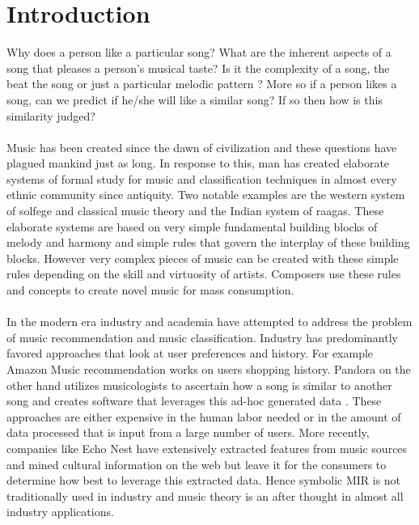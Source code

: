 \chapter{Introduction}
\label{sec:intro}

\noindent Why does a person like a particular song? What are the inherent aspects of a song that pleases a person's musical taste? Is it the complexity of a song, the beat the song or just a particular melodic pattern ? More so if a person likes a song, can we predict if he/she will like a similar song? If so then how is this similarity judged? \\\\
Music has been created since the dawn of civilization and these questions have plagued mankind just as long. In response to this, man has created elaborate systems of formal study for music and classification techniques in almost every ethnic community since antiquity. Two notable examples are the western system of solfege and classical music theory and the Indian system of raagas. These elaborate systems are based on very simple fundamental building blocks of melody and harmony and simple rules that govern the interplay of these building blocks. However very complex pieces of music can be created with these simple rules depending on the skill and virtuosity of artists. Composers use these rules and concepts to create novel music for mass consumption. \\\\
In the modern era industry and academia have attempted to address the problem of music recommendation and music classification. Industry has predominantly favored approaches that look at user preferences and history. For example Amazon Music recommendation works on users shopping history. Pandora on the other hand utilizes musicologists to ascertain how a song is similar to another song and creates software that leverages this ad-hoc generated data \cite{musicgenomepandora}. These approaches are either expensive in the human labor needed or in the amount of data processed that is input from a large number of users. More recently, companies like Echo Nest have extensively extracted features from music sources \cite{echonestfingerprint} and mined cultural information on the web but leave it for the consumers to determine how best to leverage this extracted data. Hence symbolic MIR is not traditionally used in industry and music theory is an after thought in almost all industry applications. \\\\
